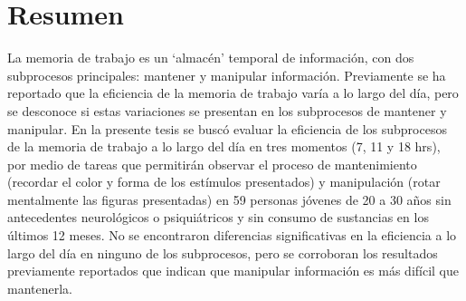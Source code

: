 \documentclass[12pt,letterpaper,final]{article}
\begin{document}
\tableofcontents

\clearpage



\newpage
{}

\doublespacing


\section*{Resumen}

La memoria de trabajo es un `almacén' temporal de información, con dos subprocesos principales: mantener y manipular información. Previamente se ha reportado que la eficiencia de la memoria de trabajo varía a lo largo del día, pero se desconoce si estas variaciones se presentan en los subprocesos de mantener y manipular. En la presente tesis se buscó evaluar la eficiencia de los subprocesos de la memoria de trabajo a lo largo del día en tres momentos (7, 11 y 18 hrs), por medio de tareas que permitirán observar el proceso de mantenimiento (recordar el color y forma de los estímulos presentados) y manipulación (rotar mentalmente las figuras presentadas) en 59 personas jóvenes de 20 a 30 años sin antecedentes neurológicos o psiquiátricos y sin consumo de sustancias en los últimos 12 meses. No se encontraron diferencias significativas en la eficiencia a lo largo del día en ninguno de los subprocesos, pero se corroboran los resultados previamente reportados que indican que manipular información es más difícil que mantenerla.
\newpage
\end{document}
